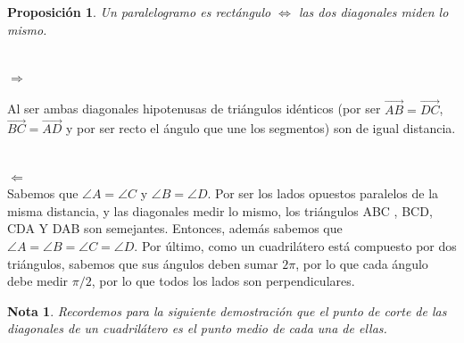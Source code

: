 \documentclass[11pt, a4paper]{article}
\makeatletter
\newif\IfInSansMode
\let\oldsf\sffamily
\renewcommand*{\sffamily}{\oldsf\mathversion{sans}\InSansModetrue}
\let\oldnorm\normalfont
\renewcommand*{\normalfont}{\oldnorm\InSansModefalse\mathversion{normal}}
\renewenvironment{proof}[1][\proofname] {\vspace{-15pt}\par\pushQED{\qed}\normalfont\topsep6\p@\@plus6\p@\relax\trivlist\item[\hskip\labelsep\it#1\@addpunct{.}]\ignorespaces}{\popQED\endtrivlist\@endpefalse}
\renewcommand{\vec}{\overrightarrow}
\renewenvironment{proof}[1][\proofname] {\par\pushQED{\qed}\normalfont\topsep6\p@\@plus6\p@\relax\trivlist\item[\hskip\labelsep\itshape\sffamily#1\@addpunct{.}]\ignorespaces}{\popQED\endtrivlist\@endpefalse}
\theoremstyle{theorem-style}
\newtheorem{nprop}{Proposición}[section]
\theoremstyle{definition-style}
\theoremstyle{remark-style}
\newtheorem*{nota}{Nota}
\theoremstyle{example-style}
\makeatother
\begin{document}
\begin{nprop}
  Un paralelogramo es rectángulo $\iff$ las dos diagonales miden lo mismo.
\end{nprop}
\begin{proof}\hfill \\
  $\boxed{\Rightarrow}$\hfill\\
   \begin{minipage}[c]{0.75\textwidth}
  
  Al ser ambas diagonales hipotenusas de triángulos idénticos (por ser $\vec{AB}=\vec{DC}$, $\vec{BC}=\vec{AD}$ y por ser recto el ángulo que une los segmentos) son de igual distancia.\hfill

  \end{minipage}\hfill
  \begin{minipage}[]{0.2\textwidth}
  

  
 
  \end{minipage}\\
  $\boxed{\Leftarrow}$ \\
  Sabemos que $\angle A = \angle C $ y $\angle B = \angle D$.
  Por ser los lados opuestos paralelos de la misma distancia, y las diagonales medir lo mismo, los triángulos ABC , BCD, CDA Y DAB son semejantes. Entonces, además sabemos que  $\angle A = \angle
 B = \angle C  = \angle D$. Por último, como un cuadrilátero está compuesto por dos triángulos, sabemos que sus ángulos deben sumar $2\pi$, por lo que cada ángulo debe
  medir $\pi/2$, por lo que todos los lados son perpendiculares.
  
\end{proof}

\begin{nota}
	Recordemos para la siguiente demostración que el punto de corte de las diagonales de un cuadrilátero es el punto medio de cada una de ellas.
\end{nota}
\end{document}
